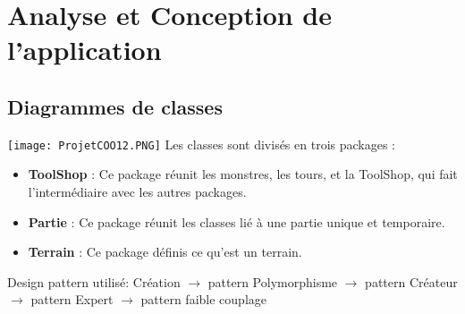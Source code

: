 \documentclass[12pt, letterpaper]{article}
\begin{document}
{\section{Analyse et Conception de l’application}

\subsection{Diagrammes de classes}
\texttt{[image: ProjetCOO12.PNG]} \newline
Les classes sont divisés en trois packages :
\begin{itemize}
\item \textbf{ToolShop} : Ce package réunit les monstres, les tours, et la ToolShop, qui fait l'intermédiaire avec les autres packages.
\item \textbf{Partie} : Ce package réunit les classes lié à une partie unique et temporaire.
\item \textbf{Terrain} : Ce package définis ce qu'est un terrain.
\end{itemize}
\clearpage
\BgThispage
Design pattern utilisé: Création \newline
$\rightarrow$ pattern Polymorphisme \newline
$\rightarrow$ pattern Créateur \newline
$\rightarrow$ pattern Expert \newline
$\rightarrow$ pattern faible couplage \newline

}
\end{document}
